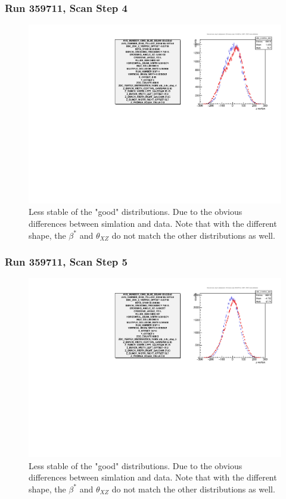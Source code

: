 \begin{frame}
\frametitle{Run 359711, Scan Step 4}
\begin{figure}
\begin{center}
\includegraphics[width=\linewidth]{"figs/359711_step_4_zdc_zvertex"}
\caption{Less stable of the "good" distributions. Due to the obvious differences between simlation and data. Note that with the different shape, the $\beta^*$ and $\theta_{XZ}$ do not match the other distributions as well.}
\label{fig:359711_step_4_zdc_zvertex}
\end{center}\end{figure}
\end{frame}

\begin{frame}
\frametitle{Run 359711, Scan Step 5}
\begin{figure}
\begin{center}
\includegraphics[width=\linewidth]{"figs/359711_step_5_zdc_zvertex"}
\caption{Less stable of the "good" distributions. Due to the obvious differences between simlation and data. Note that with the different shape, the $\beta^*$ and $\theta_{XZ}$ do not match the other distributions as well.}
\label{fig:359711_step_5_zdc_zvertex}
\end{center}\end{figure}
\end{frame}

